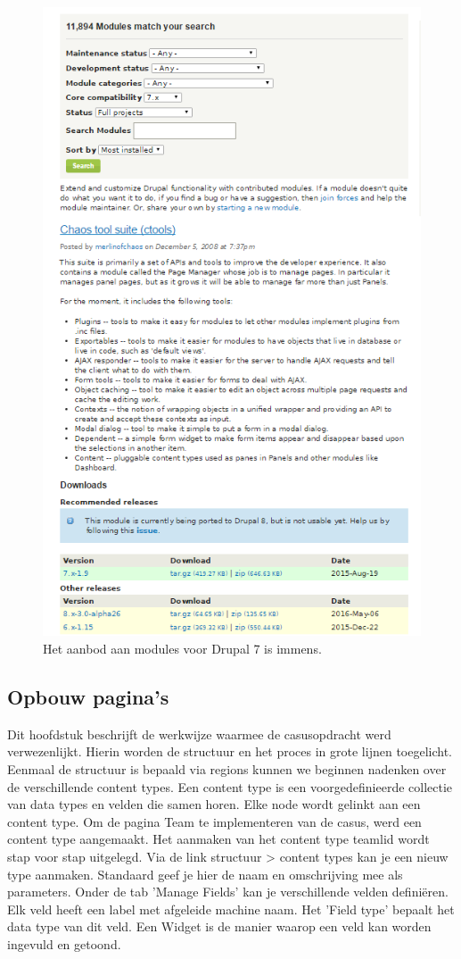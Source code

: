 \begin{figure}[!ht]
  \includegraphics[width=115mm]{img/dr-modules.png}
  \centering
  \caption{Het aanbod aan modules voor Drupal 7 is immens.}
  \label{fig:Drupal modules.}
\end{figure}

\pagebreak
\subsection{Opbouw pagina's}
Dit hoofdstuk beschrijft de werkwijze waarmee de casusopdracht werd verwezenlijkt. Hierin worden  de structuur en het proces in grote lijnen toegelicht.
\newline\newline
Eenmaal de structuur is bepaald via regions kunnen we beginnen nadenken over de verschillende content types. Een content type is een voorgedefinieerde collectie van data types en velden die samen horen. Elke node wordt gelinkt aan een content type. Om de pagina Team te implementeren van de casus, werd een content type aangemaakt. Het aanmaken van het content type teamlid wordt stap voor stap uitgelegd. Via de link structuur > content types kan je een nieuw type aanmaken. Standaard geef je hier de naam en omschrijving mee als parameters. Onder de tab 'Manage Fields' kan je verschillende velden definiëren. Elk veld heeft een label met afgeleide machine naam. Het 'Field type' bepaalt het data type van dit veld. Een Widget is de manier waarop een veld kan worden ingevuld en getoond. 

